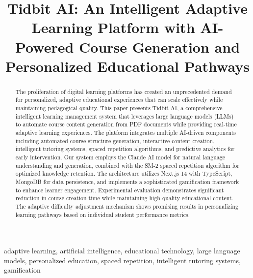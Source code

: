 \documentclass[conference]{IEEEtran}
\begin{document}
\title{Tidbit AI: An Intelligent Adaptive Learning Platform with AI-Powered Course Generation and Personalized Educational Pathways}

\author{
\and
{}
}

\maketitle

\begin{abstract}
The proliferation of digital learning platforms has created an unprecedented demand for personalized, adaptive educational experiences that can scale effectively while maintaining pedagogical quality. This paper presents Tidbit AI, a comprehensive intelligent learning management system that leverages large language models (LLMs) to automate course content generation from PDF documents while providing real-time adaptive learning experiences. The platform integrates multiple AI-driven components including automated course structure generation, interactive content creation, intelligent tutoring systems, spaced repetition algorithms, and predictive analytics for early intervention. Our system employs the Claude AI model for natural language understanding and generation, combined with the SM-2 spaced repetition algorithm for optimized knowledge retention. The architecture utilizes Next.js 14 with TypeScript, MongoDB for data persistence, and implements a sophisticated gamification framework to enhance learner engagement. Experimental evaluation demonstrates significant reduction in course creation time while maintaining high-quality educational content. The adaptive difficulty adjustment mechanism shows promising results in personalizing learning pathways based on individual student performance metrics.
\end{abstract}

\begin{IEEEkeywords}
adaptive learning, artificial intelligence, educational technology, large language models, personalized education, spaced repetition, intelligent tutoring systems, gamification
\end{IEEEkeywords}
\end{document}
